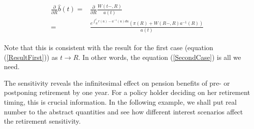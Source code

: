 \documentclass{article}
\newcommand{\1}[1]{\mathbbm{1}_{\left\lbrace #1 \right\rbrace}}
\theoremstyle{break}
\theoremstyle{remark}
\numberwithin{equation}{section}
\begin{document}
\begin{align} \label{SecondCase}
\begin{split}
	\frac{\partial}{\partial R} \hat{b}(t) =& \frac{\partial}{\partial R} \frac{W(t-,R)}{a(t)} \\ =& \frac{e^{\int_R^t r(u) - a^{-1}(u) du} \left( \pi (R) + W(R-,R) a^{-1}(R) \right)}{a(t)}
\end{split}
\end{align}

Note that this is consistent with the result for the first case (equation (\ref{ResultFirst})) as $t \to R$. In other words, the equation (\ref{SecondCase}) is all we need.

The sensitivity reveals the infinitesimal effect on pension benefits of pre- or postponing retirement by one year. For a policy holder deciding on her retirement timing, this is crucial information. In the following example, we shall put real number to the abstract quantities and see how different interest scenarios affect the retirement sensitivity.
\end{document}
